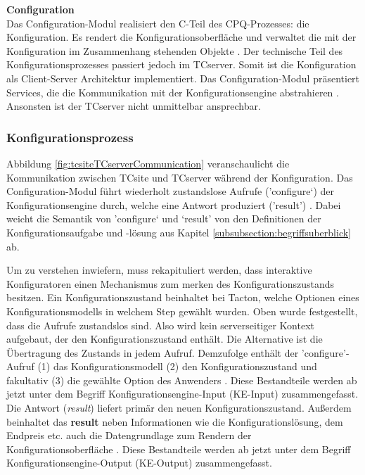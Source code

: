 \documentclass[12pt,a4paper,bibliography=totocnumbered,listof=totoc]{scrartcl}
\begin{document}
\textbf{Configuration}\\
Das Configuration-Modul realisiert den C-Teil des CPQ-Prozesses: die Konfiguration. Es rendert die Konfigurationsoberfläche und verwaltet die mit der Konfiguration im Zusammenhang stehenden Objekte \citep{tactonTCsiteDevelopmentManual}. Der technische Teil des Konfigurationsprozesses passiert jedoch im TCserver. Somit ist die Konfiguration als Client-Server Architektur implementiert. Das Configuration-Modul präsentiert Services, die die Kommunikation mit der Konfigurationsengine abstrahieren \citep{tactonTCsiteApiDocu}. Ansonsten ist der TCserver nicht unmittelbar ansprechbar.

\subsubsection{Konfigurationsprozess}
\label{subsubsection:tcsiteKonfigurationsprozess}

Abbildung \ref{fig:tcsiteTCserverCommunication} veranschaulicht die Kommunikation zwischen TCsite und TCserver während der Konfiguration. Das Configuration-Modul führt wiederholt zustandslose Aufrufe ('configure‘) der Konfigurationsengine durch, welche eine Antwort produziert ('result') \citep{tactonTCsiteDevelopmentManual}. Dabei weicht die Semantik von 'configure‘ und ‘result' von den Definitionen der Konfigurationsaufgabe und -lösung aus Kapitel \ref{subsubsection:begriffsuberblick} ab.

Um zu verstehen inwiefern, muss rekapituliert werden, dass interaktive Konfiguratoren einen Mechanismus zum merken des Konfigurationszustands besitzen. Ein Konfigurationszustand beinhaltet bei Tacton, welche Optionen eines Konfigurationsmodells in welchem Step gewählt wurden. Oben wurde festgestellt, dass die Aufrufe zustandslos sind. Also wird kein serverseitiger Kontext aufgebaut, der den Konfigurationszustand enthält. Die Alternative ist die Übertragung des Zustands in jedem Aufruf. Demzufolge enthält der 'configure'-Aufruf (1) das Konfigurationsmodell (2) den Konfigurationszustand und fakultativ (3) die gewählte Option des Anwenders \citep{tactonTCsiteApiDocu}. Diese Bestandteile werden ab jetzt unter dem Begriff Konfigurationsengine-Input (KE-Input) zusammengefasst. Die Antwort (\emph{result}) liefert primär den neuen Konfigurationszustand. Außerdem beinhaltet das \textbf{result} neben Informationen wie die Konfigurationslösung, dem Endpreis etc. auch die Datengrundlage zum Rendern der Konfigurationsoberfläche \citep{tactonTCsiteApiDocu}. Diese Bestandteile werden ab jetzt unter dem Begriff Konfigurationsengine-Output (KE-Output) zusammengefasst.
\end{document}
